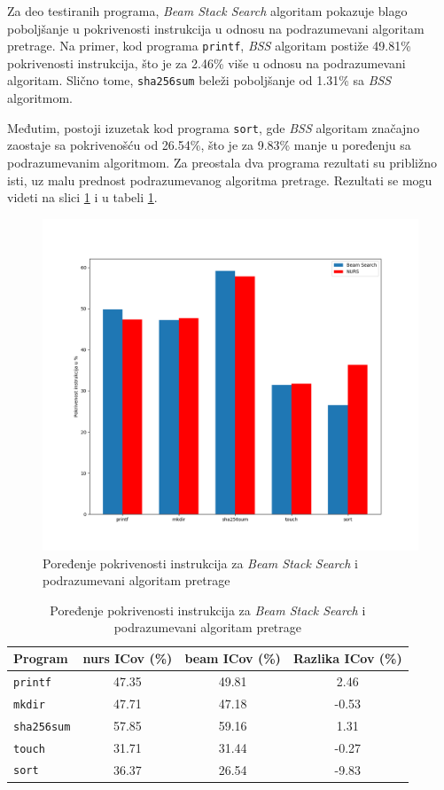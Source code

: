 \documentclass[a4paper]{article}
\begin{document}
Za deo testiranih programa, \textit{Beam Stack Search} algoritam pokazuje blago poboljšanje u pokrivenosti instrukcija u odnosu na podrazumevani algoritam pretrage. Na primer, kod programa \verb|printf|, \textit{BSS} algoritam postiže 49.81\% pokrivenosti instrukcija, što je za 2.46\% više u odnosu na podrazumevani algoritam. Slično tome, \verb|sha256sum| beleži poboljšanje od 1.31\% sa \textit{BSS} algoritmom.

Međutim, postoji izuzetak kod programa \verb|sort|, gde \textit{BSS} algoritam značajno zaostaje sa pokrivenošću od 26.54\%, što je za 9.83\% manje u poređenju sa podrazumevanim algoritmom. Za preostala dva programa rezultati su približno isti, uz malu prednost podrazumevanog algoritma pretrage. Rezultati se mogu videti na slici \ref{fig:icov_comparison} i u tabeli \ref{tab:icov_comparison}.

\begin{figure}[h!]
    \centering
    \includegraphics[width=\linewidth]{ilustracije/ICov.png}
    \caption{Poređenje pokrivenosti instrukcija za \textit{Beam Stack Search} i podrazumevani algoritam pretrage}
    \label{fig:icov_comparison}
\end{figure}

\begin{table}[h!]
\centering
\begin{tabular}{|l|c|c|c|}
\hline
\textbf{Program} & \textbf{nurs ICov (\%)} & \textbf{beam ICov (\%)} & \textbf{Razlika ICov (\%)} \\ \hline
\texttt{printf} & 47.35 & 49.81 & 2.46 \\ \hline
\texttt{mkdir} & 47.71 & 47.18 & -0.53 \\ \hline
\texttt{sha256sum} & 57.85 & 59.16 & 1.31 \\ \hline
\texttt{touch} & 31.71 & 31.44 & -0.27 \\ \hline
\texttt{sort} & 36.37 & 26.54 & -9.83 \\ \hline
\end{tabular}
\caption{Poređenje pokrivenosti instrukcija za \textit{Beam Stack Search} i podrazumevani algoritam pretrage}
\label{tab:icov_comparison}
\end{table}
\end{document}
